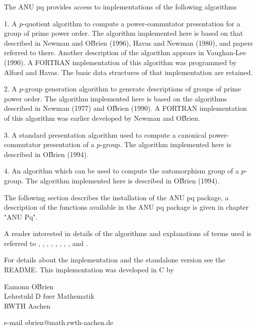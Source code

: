 
The   ANU  pq  provides  access  to  implementations   of  the  following
algorithms\:

1.  A $p$-quotient algorithm  to compute  a power-commutator presentation
for a group  of  prime power order.  The  algorithm implemented  here  is
based on that described in Newman and O\'Brien (1996), Havas and Newman 
(1980), and papers referred to there.   Another  description  of  the  
algorithm appears in  Vaughan-Lee (1990).  A FORTRAN implementation  of 
this algorithm  was  programmed  by Alford and Havas.  The basic  data 
structures  of that implementation are retained.

2. A $p$-group generation algorithm to generate descriptions of groups of
prime  power  order.   The  algorithm  implemented here is based  on  the
algorithms described in Newman  (1977)  and O\'Brien  (1990).  A  FORTRAN
implementation of  this  algorithm  was  earlier  developed by Newman and
O\'Brien.

3.   A  standard presentation   algorithm  used  to compute  a  canonical
power-commutator presentation  of a $p$-group. The  algorithm implemented
here is described in O\'Brien (1994).

4. An algorithm which can be used to compute  the automorphism group of a
$p$-group. The algorithm implemented here is described in O\'Brien (1994).

The following section describes the installation of the ANU pq package, a
description of the functions available in the  ANU pq package is given in
chapter "ANU Pq".

A reader interested  in details  of the  algorithms  and explanations  of
terms  used  is  referred  to  \cite{NO96}, \cite{HN80},  \cite{OBr90},  
\cite{OBr94}, \cite{OBr95},    \cite{New77},    \cite{Vau84},     
\cite{Vau90a},  and \cite{Vau90b}.

For  details about  the implementation and the standalone version see the
README. This implementation was developed in C by

Eamonn O\'Brien\\
Lehrstuhl D fuer Mathematik\\
RWTH Aachen

e-mail obrien@math.rwth-aachen.de


